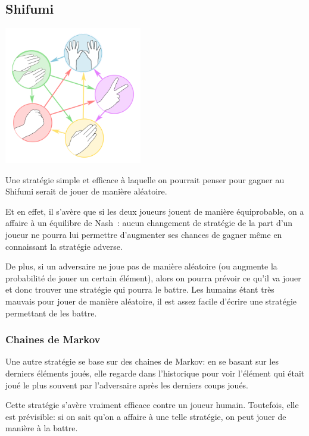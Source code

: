 \subsection{Shifumi}

    \begin{center}\includegraphics[width=6cm]{shifumi.png}\end{center}

    Une stratégie simple et efficace à laquelle on pourrait penser pour gagner
    au Shifumi serait de jouer de manière aléatoire.

    Et en effet, il s'avère que si les deux joueurs jouent de manière équiprobable,
    on a affaire à un équilibre de Nash~: aucun changement de stratégie de la part
    d'un joueur ne pourra lui permettre d'augmenter ses chances de gagner même
    en connaissant la stratégie adverse.

    De plus, si un adversaire ne joue pas de manière aléatoire (ou augmente la
    probabilité de jouer un certain élément), alors on pourra prévoir ce qu'il
    va jouer et donc trouver une stratégie qui pourra le battre. Les humains
    étant très mauvais pour jouer de manière aléatoire, il est assez facile
    d'écrire une stratégie permettant de les battre.

  \subsubsection{Chaines de Markov}
    Une autre stratégie se base sur des chaines de Markov: en se basant sur les
    derniers éléments joués, elle regarde dans l'historique pour voir l'élément
    qui était joué le plus souvent par l'adversaire après les derniers coups
    joués.

    Cette stratégie s'avère vraiment efficace contre un joueur humain.
    Toutefois, elle est prévisible: si on sait qu'on a affaire à une telle
    stratégie, on peut jouer de manière à la battre.

